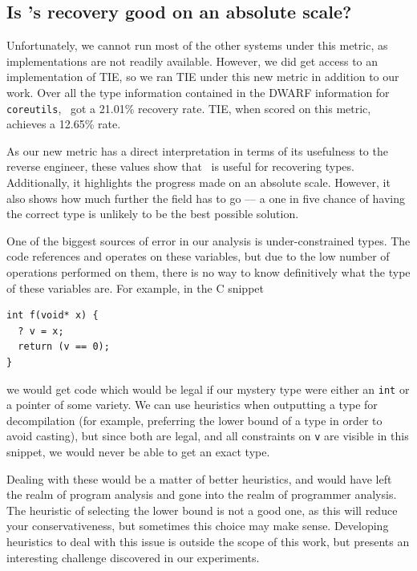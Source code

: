 \subsection{Is \bitr's recovery good on an absolute scale?}
Unfortunately, we cannot run most of the other systems under this metric, as implementations are not readily available. However, we did get access to an implementation of TIE, so we ran TIE under this new metric in addition to our work. Over all the type information contained in the DWARF information for \texttt{coreutils}, \bitr\ got a 21.01\% recovery rate. TIE, when scored on this metric, achieves a 12.65\% rate.

As our new metric has a direct interpretation in terms of its usefulness to the reverse engineer, these values show that \bitr\ is useful for recovering types. Additionally, it highlights the progress made on an absolute scale. However, it also shows how much further the field has to go --- a one in five chance of having the correct type is unlikely to be the best possible solution.

One of the biggest sources of error in our analysis is under-constrained types. The code references and operates on these variables, but due to the low number of operations performed on them, there is no way to know definitively what the type of these variables are. For example, in the C snippet
\begin{verbatim}
int f(void* x) {
  ? v = x;
  return (v == 0);
}
\end{verbatim}
we would get code which would be legal if our mystery type were either an \texttt{int} or a pointer of some variety. We can use heuristics when outputting a type for decompilation (for example, preferring the lower bound of a type in order to avoid casting), but since both are legal, and all constraints on \texttt{v} are visible in this snippet, we would never be able to get an exact type.

Dealing with these would be a matter of better heuristics, and would have left the realm of program analysis and gone into the realm of programmer analysis. The heuristic of selecting the lower bound is not a good one, as this will reduce your conservativeness, but sometimes this choice may make sense. Developing heuristics to deal with this issue is outside the scope of this work, but presents an interesting challenge discovered in our experiments.

